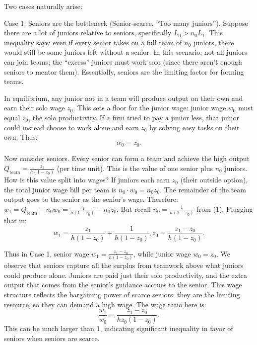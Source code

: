 \documentclass[12pt]{article}
\begin{document}
Two cases naturally arise:

{Case 1: Seniors are the bottleneck (Senior-scarce, ``Too many
juniors'').} Suppose there are a lot of juniors relative to seniors,
specifically \(L_0 > n_0 L_1\). This inequality says: even if every
senior takes on a full team of \(n_0\) juniors, there would still be
some juniors left without a senior. In this scenario, {not all
juniors can join teams}; the ``excess'' juniors must work solo (since
there aren't enough seniors to mentor them). Essentially, seniors are
the limiting factor for forming teams.

In equilibrium, any junior {not} in a team will produce output on
their own and earn their solo wage \(z_0\). This sets a floor for the
junior wage: {junior wage \(w_0\) must equal \(z_0\)}, the solo
productivity. If a firm tried to pay a junior less, that junior could
instead choose to work alone and earn \(z_0\) by solving easy tasks on
their own. Thus: 
\begin{equation}
    w_0 = z_0. \tag{3}
\end{equation}

Now consider seniors. Every senior can form a team and achieve the
high output \(Q_{\text{team}} = \frac{z_1}{h(1-z_0)}\) (per time
unit). This is the {value of one senior plus \(n_0\) juniors}.
How is this value split into wages? If juniors each earn \(z_0\)
(their outside option), the total junior wage bill per team is
\(n_0 \cdot w_0 = n_0 z_0\). The remainder of the team output goes to
the senior as the senior's wage. Therefore:
\(w_1 = Q_{\text{team}} - n_0 w_0 = \frac{z_1}{h(1-z_0)} - n_0 z_0.\)
But recall \(n_0 = \frac{1}{h(1-z_0)}\) from (1). Plugging that in: 
\begin{equation}
w_1  =  \frac{z_1}{h(1-z_0)} + \frac{1}{h(1-z_0)} ,z_0  = 
\frac{z_1 - z_0}{h(1-z_0)}. \tag{4}
\end{equation}

Thus in Case 1, {senior wage}
\(w_1 = \frac{z_1 - z_0}{h(1-z_0)}\), while {junior wage}
\(w_0 = z_0\). We observe that seniors capture all the {surplus}
from teamwork above what juniors could produce alone. Juniors are paid
just their solo productivity, and the extra output that comes from the
senior's guidance accrues to the senior. This wage structure reflects
the {bargaining power of scarce seniors}: they are the limiting
resource, so they can demand a high wage. The {wage ratio} here
is: 
\begin{equation}
\frac{w_1}{w_0}  =  \frac{z_1 - z_0}{hz_0(1-z_0)}.
\tag{5}
\end{equation}
This can be much larger than 1, indicating significant
inequality in favor of seniors when seniors are scarce.
\end{document}
